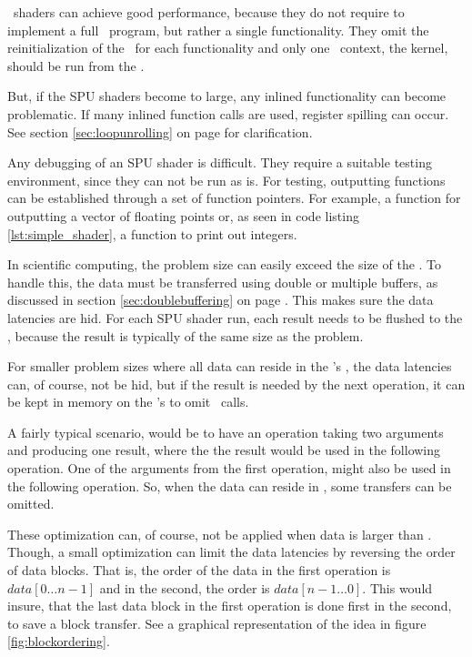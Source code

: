 \SPU\ shaders can achieve good performance, because they do not
 require to implement a full \SPE\ program, but rather a single
 functionality. They omit the reinitialization of the \SPE\ for each
 functionality and only one \SPE\ context, the kernel, should be run
 from the \PPE{}.

But, if the SPU shaders become to large, any inlined functionality can
become problematic. If many inlined function calls are used, register
spilling can occur. See section \ref{sec:loopunrolling} on
page \pageref{sec:loopunrolling} for clarification.

Any debugging of an SPU shader is difficult. They require a suitable
testing environment, since they can not be run as is. For testing,
outputting functions can be established through a set of function
pointers. For example, a function for outputting a vector of floating
points or, as seen in code listing \ref{lst:simple_shader}, a function
to print out integers.

In scientific computing, the problem size can easily exceed the size
of the \LS{}. To handle this, the data must be transferred using
double or multiple buffers, as discussed in
section \ref{sec:doublebuffering} on
page \pageref{sec:doublebuffering}. This makes sure the data latencies
are hid. For each SPU shader run, each result needs to be flushed to
the \PPE{}, because the result is typically of the same size as the
problem.

For smaller problem sizes where all data can reside in
the \SPE{}'s \LS{}, the data latencies can, of course, not be hid,
but if the result is needed by the next operation, it can be kept in
memory on the \SPE{}'s to omit \DMA\ calls.


A fairly typical scenario, would be to have an operation taking two
arguments and producing one result, where the the result would be used
in the following operation. One of the arguments from the first
operation, might also be used in the following operation. So, when the
data can reside in \LS{}, some transfers can be omitted.

These optimization can, of course, not be applied when data is larger
than \LS{}. Though, a small optimization can limit the data latencies
by reversing the order of data blocks. That is, the order of the data
in the first operation is $data[0 \dots n-1]$ and in the second, the
order is $data[n-1 \dots 0]$. This would insure, that the last data
block in the first operation is done first in the second, to save a
block transfer. See a graphical representation of the idea in
figure \ref{fig:blockordering}.

